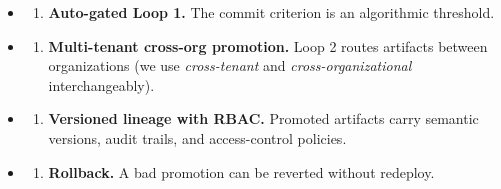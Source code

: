 \documentclass[
]{article}
\providecommand{\tightlist}{%
  \setlength{\itemsep}{0pt}\setlength{\parskip}{0pt}}
\begin{document}
\begin{itemize}
\tightlist
\item
  \begin{enumerate}
  \def\labelenumi{(\alph{enumi})}
  \tightlist
  \item
    \textbf{Auto-gated Loop 1.} The commit criterion is an algorithmic
    threshold.
  \end{enumerate}
\item
  \begin{enumerate}
  \def\labelenumi{(\alph{enumi})}
  \setcounter{enumi}{1}
  \tightlist
  \item
    \textbf{Multi-tenant cross-org promotion.} Loop 2 routes artifacts
    between organizations (we use \emph{cross-tenant} and
    \emph{cross-organizational} interchangeably).
  \end{enumerate}
\item
  \begin{enumerate}
  \def\labelenumi{(\alph{enumi})}
  \setcounter{enumi}{2}
  \tightlist
  \item
    \textbf{Versioned lineage with RBAC.} Promoted artifacts carry
    semantic versions, audit trails, and access-control policies.
  \end{enumerate}
\item
  \begin{enumerate}
  \def\labelenumi{(\alph{enumi})}
  \setcounter{enumi}{3}
  \tightlist
  \item
    \textbf{Rollback.} A bad promotion can be reverted without redeploy.
  \end{enumerate}
\end{itemize}
\end{document}
